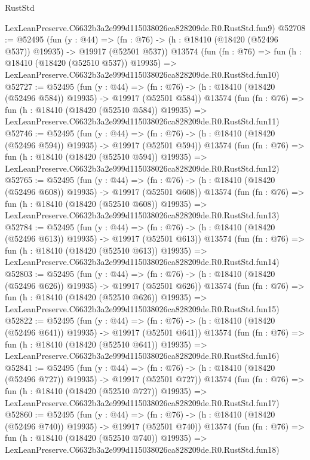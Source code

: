 \begin{lexlean}{RustStd}
\begin{coremodule}
    LexLeanPreserve.C6632b3a2e999d115038026ca828209de.R0.RustStd.fun9)
@52708 := @52495
    (fun (y : @44) =>
    (fn : @76) -> (h : @18410 (@18420 (@52496 @537)) @19935) -> @19917 (@52501 @537))
    @13574
    (fun (fn : @76) =>
    fun (h : @18410 (@18420 (@52510 @537)) @19935) =>
    LexLeanPreserve.C6632b3a2e999d115038026ca828209de.R0.RustStd.fun10)
@52727 := @52495
    (fun (y : @44) =>
    (fn : @76) -> (h : @18410 (@18420 (@52496 @584)) @19935) -> @19917 (@52501 @584))
    @13574
    (fun (fn : @76) =>
    fun (h : @18410 (@18420 (@52510 @584)) @19935) =>
    LexLeanPreserve.C6632b3a2e999d115038026ca828209de.R0.RustStd.fun11)
@52746 := @52495
    (fun (y : @44) =>
    (fn : @76) -> (h : @18410 (@18420 (@52496 @594)) @19935) -> @19917 (@52501 @594))
    @13574
    (fun (fn : @76) =>
    fun (h : @18410 (@18420 (@52510 @594)) @19935) =>
    LexLeanPreserve.C6632b3a2e999d115038026ca828209de.R0.RustStd.fun12)
@52765 := @52495
    (fun (y : @44) =>
    (fn : @76) -> (h : @18410 (@18420 (@52496 @608)) @19935) -> @19917 (@52501 @608))
    @13574
    (fun (fn : @76) =>
    fun (h : @18410 (@18420 (@52510 @608)) @19935) =>
    LexLeanPreserve.C6632b3a2e999d115038026ca828209de.R0.RustStd.fun13)
@52784 := @52495
    (fun (y : @44) =>
    (fn : @76) -> (h : @18410 (@18420 (@52496 @613)) @19935) -> @19917 (@52501 @613))
    @13574
    (fun (fn : @76) =>
    fun (h : @18410 (@18420 (@52510 @613)) @19935) =>
    LexLeanPreserve.C6632b3a2e999d115038026ca828209de.R0.RustStd.fun14)
@52803 := @52495
    (fun (y : @44) =>
    (fn : @76) -> (h : @18410 (@18420 (@52496 @626)) @19935) -> @19917 (@52501 @626))
    @13574
    (fun (fn : @76) =>
    fun (h : @18410 (@18420 (@52510 @626)) @19935) =>
    LexLeanPreserve.C6632b3a2e999d115038026ca828209de.R0.RustStd.fun15)
@52822 := @52495
    (fun (y : @44) =>
    (fn : @76) -> (h : @18410 (@18420 (@52496 @641)) @19935) -> @19917 (@52501 @641))
    @13574
    (fun (fn : @76) =>
    fun (h : @18410 (@18420 (@52510 @641)) @19935) =>
    LexLeanPreserve.C6632b3a2e999d115038026ca828209de.R0.RustStd.fun16)
@52841 := @52495
    (fun (y : @44) =>
    (fn : @76) -> (h : @18410 (@18420 (@52496 @727)) @19935) -> @19917 (@52501 @727))
    @13574
    (fun (fn : @76) =>
    fun (h : @18410 (@18420 (@52510 @727)) @19935) =>
    LexLeanPreserve.C6632b3a2e999d115038026ca828209de.R0.RustStd.fun17)
@52860 := @52495
    (fun (y : @44) =>
    (fn : @76) -> (h : @18410 (@18420 (@52496 @740)) @19935) -> @19917 (@52501 @740))
    @13574
    (fun (fn : @76) =>
    fun (h : @18410 (@18420 (@52510 @740)) @19935) =>
    LexLeanPreserve.C6632b3a2e999d115038026ca828209de.R0.RustStd.fun18)

\end{coremodule}
\end{lexlean}
